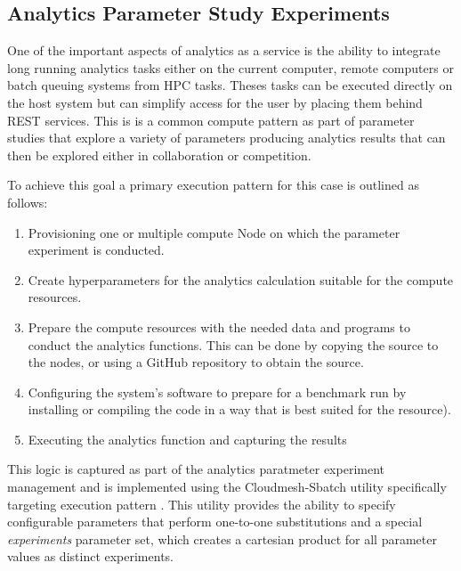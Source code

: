 \subsection{Analytics Parameter Study Experiments}

One of the important aspects of analytics as a service is the ability to integrate long running analytics tasks either 
on the current computer, remote computers or batch queuing systems from HPC tasks. Theses tasks can be 
executed directly on the host system but can simplify access for the user by placing them behind REST 
services. This is is a common compute pattern as part of parameter studies that explore a variety of 
parameters producing analytics results that can then be explored either in collaboration or competition. 

To achieve this goal a primary execution pattern for this case is outlined as follows:


\begin{enumerate}
    \item Provisioning one or multiple compute Node on which the parameter experiment is conducted.
    \item Create hyperparameters for the analytics calculation suitable for the compute resources.
    \item Prepare the compute resources with the needed data and programs to conduct the analytics 
          functions. This can be done by copying the source to the nodes, or using a GitHub repository to 
          obtain the source.
    \item Configuring the system's software to prepare for a benchmark run by installing or compiling the code 
          in a way that is best suited for the resource).
    \item Executing the analytics function and capturing the results
\end{enumerate}

This logic is captured as part of the analytics paratmeter experiment  management and is implemented using the Cloudmesh-Sbatch utility specifically targeting execution pattern \cite{repo-cloudmesh-sbatch}.
This utility provides the ability to specify configurable parameters that perform one-to-one substitutions and a special \textit{experiments} parameter set, which creates a  cartesian product for all parameter values as distinct experiments.

